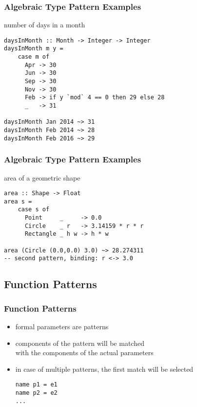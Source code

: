 \documentclass[dvipsnames]{beamer}
\theoremstyle{plain}
\begin{document}
\begin{frame}[fragile]
  \frametitle{Algebraic Type Pattern Examples}

  \begin{exampleblock}{number of days in a month}
    \begin{lstlisting}
daysInMonth :: Month -> Integer -> Integer
daysInMonth m y =
    case m of
      Apr -> 30
      Jun -> 30
      Sep -> 30
      Nov -> 30
      Feb -> if y `mod` 4 == 0 then 29 else 28
      _   -> 31

daysInMonth Jan 2014 ~> 31
daysInMonth Feb 2014 ~> 28
daysInMonth Feb 2016 ~> 29
    \end{lstlisting}
  \end{exampleblock}
\end{frame}

\begin{frame}[fragile]
  \frametitle{Algebraic Type Pattern Examples}

  \begin{exampleblock}{area of a geometric shape}
    \begin{lstlisting}
area :: Shape -> Float
area s =
    case s of
      Point     _     -> 0.0
      Circle    _ r   -> 3.14159 * r * r
      Rectangle _ h w -> h * w

area (Circle (0.0,0.0) 3.0) ~> 28.274311
-- second pattern, binding: r <-> 3.0
    \end{lstlisting}
  \end{exampleblock}
\end{frame}

\subsection{Function Patterns}

\begin{frame}[fragile]
  \frametitle{Function Patterns}

  \begin{itemize}
    \item formal parameters are patterns
    \item components of the pattern will be matched\\
      with the components of the actual parameters

    \medskip
    \item in case of multiple patterns, the first match will be selected
    \smallskip
    \begin{lstlisting}
name p1 = e1
name p2 = e2
...
    \end{lstlisting}
  \end{itemize}
\end{frame}
\end{document}
